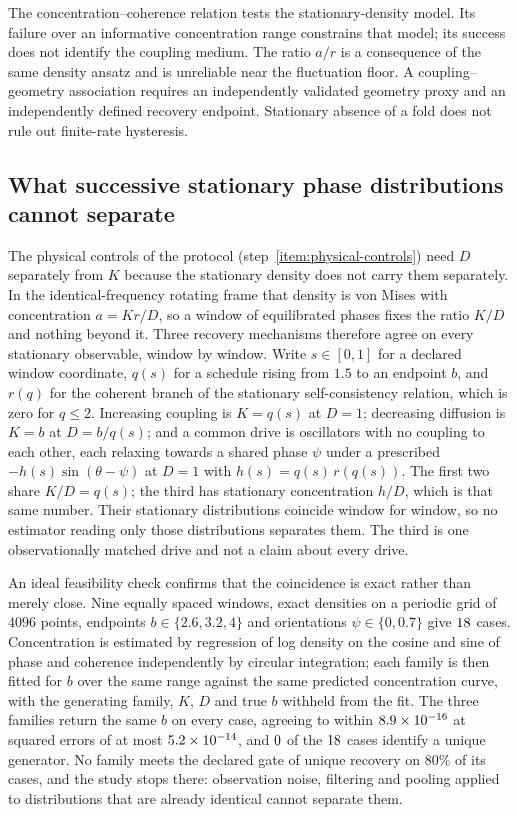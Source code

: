 \documentclass{article}
\begin{document}
The concentration--coherence relation tests the stationary-density model. Its failure over an informative concentration range constrains that model; its success does not identify the coupling medium. The ratio $a/r$ is a consequence of the same density ansatz and is unreliable near the fluctuation floor. A coupling--geometry association requires an independently validated geometry proxy and an independently defined recovery endpoint. Stationary absence of a fold does not rule out finite-rate hysteresis.

\subsection{What successive stationary phase distributions cannot separate}
\label{sec:recovery-mechanisms}

The physical controls of the protocol (step~\ref{item:physical-controls}) need $D$ separately from $K$ because
the stationary density does not carry them separately. In the
identical-frequency rotating frame that density is von Mises with concentration
$a=Kr/D$, so a window of equilibrated phases fixes the ratio $K/D$ and nothing
beyond it. Three recovery mechanisms therefore agree on every stationary
observable, window by window. Write $s\in[0,1]$ for a declared window
coordinate, $q(s)$ for a schedule rising from $1.5$ to an endpoint $b$, and
$r(q)$ for the coherent branch of the stationary self-consistency relation,
which is zero for $q\leq2$. Increasing coupling is $K=q(s)$ at $D=1$;
decreasing diffusion is $K=b$ at $D=b/q(s)$; and a common drive is oscillators
with no coupling to each other, each relaxing towards a shared phase $\psi$
under a prescribed $-h(s)\sin(\theta-\psi)$ at $D=1$ with $h(s)=q(s)\,r(q(s))$.
The first two share $K/D=q(s)$; the third has stationary concentration $h/D$,
which is that same number. Their stationary distributions coincide window for
window, so no estimator reading only those distributions separates them. The
third is one observationally matched drive and not a claim about every drive.

An ideal feasibility check confirms that the coincidence is exact rather than
merely close. Nine equally spaced windows, exact densities on a periodic grid
of $4096$ points, endpoints $b\in\{2.6,3.2,4\}$ and orientations
$\psi\in\{0,0.7\}$ give $18$ cases. Concentration is
estimated by regression of log density on the cosine and sine of phase and
coherence independently by circular integration; each family is then fitted for
$b$ over the same range against the same predicted concentration curve, with the
generating family, $K$, $D$ and true $b$ withheld from the fit. The three
families return the same $b$ on every case, agreeing to within
$8.9\times10^{-16}$ at squared errors of at most
$5.2\times10^{-14}$, and $0$ of the
$18$ cases identify a unique generator. No family meets the
declared gate of unique recovery on $80\%$ of its cases, and the study stops
there: observation noise, filtering and pooling applied to distributions that
are already identical cannot separate them.
\end{document}
